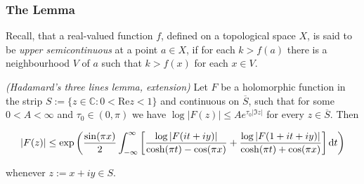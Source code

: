 \subsubsection{The Lemma}
Recall, that a real-valued function $f$, defined on a topological space $X$, is said to be \emph{upper semicontinuous} at a point $a \in X$, if for each $k > f(a)$ there is a neighbourhood $V$ of $a$ such that $k > f(x)$ for each $x \in V$.

\vspace{2mm}

\begin{mdframed}
	\begin{lemma}\emph{(Hadamard's three lines lemma, extension)}
		Let $F$ be a holomorphic function in the strip $S := \{z \in \mathbb{C}: 0 < \mathrm{Re}z < 1\}$ and continuous on $\overline{S}$, such that for some $0 < A < \infty$ and $\tau_0 \in (0,\pi)$ we have $\log \vert F(z)\vert \leq A e^{\tau_0 \vert \Im z \vert}$ for every $z \in \overline{S}$. Then

			\begin{equation*}
				\vert F(z) \vert \leq \exp\left( \frac{\sin(\pi x)}{2} \int_{-\infty}^\infty \left[ \frac{\log \vert F(it + iy)\vert}{\cosh(\pi t) - \cos(\pi x)} + \frac{\log \vert F(1 + it + iy)\vert}{\cosh(\pi t) + \cos(\pi x)} \right] \mathop{}\!\mathrm{d} t\right)
			\end{equation*}

			whenever $z := x + iy \in S$.
			\label{lem:EHTL}
	\end{lemma}
\end{mdframed}

